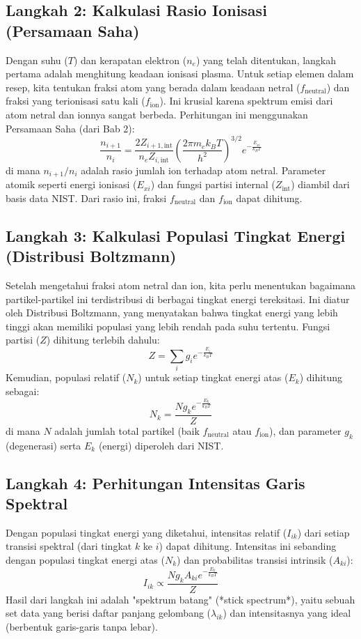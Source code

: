 \subsection{Langkah 2: Kalkulasi Rasio Ionisasi (Persamaan Saha)}
Dengan suhu ($T$) dan kerapatan elektron ($n_e$) yang telah ditentukan, langkah pertama adalah menghitung keadaan ionisasi plasma. Untuk setiap elemen dalam resep, kita tentukan fraksi atom yang berada dalam keadaan netral ($f_{\text{neutral}}$) dan fraksi yang terionisasi satu kali ($f_{\text{ion}}$). Ini krusial karena spektrum emisi dari atom netral dan ionnya sangat berbeda. Perhitungan ini menggunakan Persamaan Saha (dari Bab 2):
\begin{equation}
\frac{n_{i+1}}{n_i} = \frac{2Z_{i+1,\text{int}}}{n_e Z_{i,\text{int}}} \left( \frac{2\pi m_e k_B T}{h^2} \right)^{3/2} e^{-\frac{E_{xi}}{k_B T}}
\end{equation}
di mana $n_{i+1}/n_i$ adalah rasio jumlah ion terhadap atom netral. Parameter atomik seperti energi ionisasi ($E_{xi}$) dan fungsi partisi internal ($Z_{\text{int}}$) diambil dari basis data NIST. Dari rasio ini, fraksi $f_{\text{neutral}}$ dan $f_{\text{ion}}$ dapat dihitung.

\subsection{Langkah 3: Kalkulasi Populasi Tingkat Energi (Distribusi Boltzmann)}
Setelah mengetahui fraksi atom netral dan ion, kita perlu menentukan bagaimana partikel-partikel ini terdistribusi di berbagai tingkat energi tereksitasi. Ini diatur oleh Distribusi Boltzmann, yang menyatakan bahwa tingkat energi yang lebih tinggi akan memiliki populasi yang lebih rendah pada suhu tertentu. Fungsi partisi ($Z$) dihitung terlebih dahulu:
\begin{equation}
Z = \sum_i g_i e^{-\frac{E_i}{k_B T}}
\end{equation}
Kemudian, populasi relatif ($N_k$) untuk setiap tingkat energi atas ($E_k$) dihitung sebagai:
\begin{equation}
N_k = \frac{N g_k e^{-\frac{E_k}{k_B T}}}{Z}
\end{equation}
di mana $N$ adalah jumlah total partikel (baik $f_{\text{neutral}}$ atau $f_{\text{ion}}$), dan parameter $g_k$ (degenerasi) serta $E_k$ (energi) diperoleh dari NIST.

\subsection{Langkah 4: Perhitungan Intensitas Garis Spektral}
Dengan populasi tingkat energi yang diketahui, intensitas relatif ($I_{ik}$) dari setiap transisi spektral (dari tingkat $k$ ke $i$) dapat dihitung. Intensitas ini sebanding dengan populasi tingkat energi atas ($N_k$) dan probabilitas transisi intrinsik ($A_{ki}$):
\begin{equation}
I_{ik} \propto \frac{N g_k A_{ki} e^{-\frac{E_k}{k_B T}}}{Z}
\end{equation}
Hasil dari langkah ini adalah "spektrum batang" (*stick spectrum*), yaitu sebuah set data yang berisi daftar panjang gelombang ($\lambda_{ik}$) dan intensitasnya yang ideal (berbentuk garis-garis tanpa lebar).

